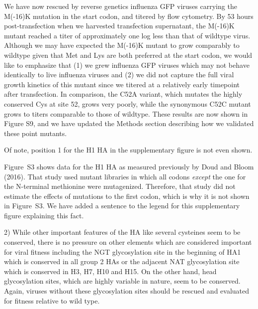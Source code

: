 \documentclass[11pt, oneside]{article}   	%
\newcommand{\response}[1]{{\color{black}#1}}
\begin{document}
\response{We have now rescued by reverse genetics influenza GFP viruses carrying the M(-16)K mutation in the start codon, and titered by flow cytometry. 
By 53 hours post-transfection when we harvested transfection supernatant, the M(-16)K mutant reached a titer of approximately one log less than that of wildtype virus.
Although we may have expected the M(-16)K mutant to grow comparably to wildtype given that Met and Lys are both preferred at the start codon, we would like to emphasize that (1) we grew influenza GFP viruses which may not behave identically to live influenza viruses and (2) we did not capture the full viral growth kinetics of this mutant since we titered at a relatively early timepoint after transfection.
In comparison, the C52A variant, which mutates the highly conserved Cys at site 52, grows very poorly, while the synonymous C52C mutant grows to titers comparable to those of wildtype.
These results are now shown in Figure S9, and we have updated the Methods section describing how we validated these point mutants.
}

Of note, position 1 for the H1 HA in the supplementary figure is not even shown. 

\response{Figure~S3 shows data for the H1 HA as measured previously by Doud and Bloom (2016). 
That study used mutant libraries in which all codons \emph{except} the one for the N-terminal methionine were mutagenized.
Therefore, that study did not estimate the effects of mutations to the first codon, which is why it is not shown in Figure~S3.
We have added a sentence to the legend for this supplementary figure explaining this fact.
}

2) While other important features of the HA like several cysteines seem to be conserved, there is no pressure on other elements which are considered important for viral fitness including the NGT glycosylation site in the beginning of HA1 which is conserved in all group 2 HAs or the adjacent NAT glycosylation site which is conserved in H3, H7, H10 and H15. On the other hand, head glycosylation sites, which are highly variable in nature, seem to be conserved. Again, viruses without these glycosylation sites should be rescued and evaluated for fitness relative to wild type. 
\end{document}
